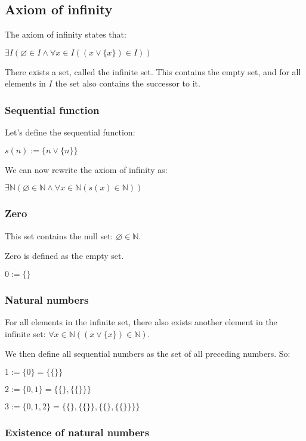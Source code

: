 
\subsection{Axiom of infinity}


The axiom of infinity states that:

$\exists I (\varnothing \in I \land \forall x \in I((x\lor \{x\})\in I))$

There exists a set, called the infinite set. This contains the empty set, and for all elements in \(I\) the set also contains the successor to it.

\subsubsection{Sequential function}

Let's define the sequential function:

$s(n):=\{n\lor \{n\}\}$

We can now rewrite the axiom of infinity as:

$\exists \mathbb{N} (\varnothing \in \mathbb{N} \land \forall x \in \mathbb{N}(s(x)\in \mathbb{N}))$

\subsubsection{Zero}

This set contains the null set: \(\varnothing \in \mathbb{N} \).

Zero is defined as the empty set.

$0:=\{\}$

\subsubsection{Natural numbers}

For all elements in the infinite set, there also exists another element in the infinite set: \(\forall x \in \mathbb{N}((x\lor \{x\})\in \mathbb{N}) \).

We then define all sequential numbers as the set of all preceding numbers. So:

$1:=\{0\}=\{\{\}\}$

$2:=\{0,1\}=\{\{\},\{\{\}\}\}$

$3:=\{0,1,2\}=\{\{\},\{\{\}\},\{\{\},\{\{\}\}\}\}$

\subsubsection{Existence of natural numbers}

